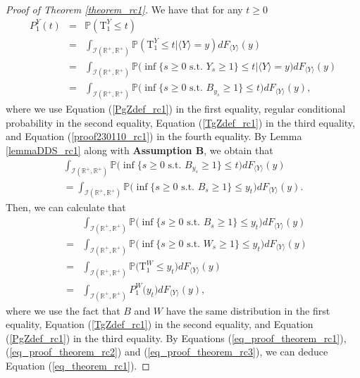 \documentclass[aop]{imsart}
\theoremstyle{plain}
\theoremstyle{remark}
\newcommand{\reels}{\mathbb{R}}
\newcommand{\proba}{\mathbb{P}}
\newcommand{\Tau}{\mathrm{T}}
\begin{document}
\begin{proof}[Proof of Theorem \ref{theorem_rc1}]
We have that for any $t \geq 0$
\begin{eqnarray}
\nonumber P_1^Y(t) & = & \proba (\Tau^Y_1 \leq t)\\ \nonumber & = & \int_{\mathcal{I}(\reels^+,\reels^+)} \proba (\Tau^{Y}_1 \leq t |\langle Y\rangle=y) dF_{\langle Y\rangle}(y)\\ \nonumber 
& = & \int_{\mathcal{I}(\reels^+,\reels^+)} \proba \big(\inf \{s \geq 0 \text{ s.t. } Y_s \geq 1\} \leq t |\langle Y\rangle=y\big)dF_{\langle Y\rangle}(y)\\ \label{eq_proof_theorem_rc1} 
& = & \int_{\mathcal{I}(\reels^+,\reels^+)} \proba \big(\inf \{s \geq 0\text{ s.t. } B_{y_{s}} \geq 1\} \leq t\big)dF_{\langle Y\rangle}(y),
\end{eqnarray}
where we use Equation (\ref{PgZdef_rc1}) in the first equality, regular conditional probability in the second equality,  Equation (\ref{TgZdef_rc1}) in the third equality, and Equation (\ref{proof230110_rc1}) in the fourth equality. By Lemma \ref{lemmaDDS_rc1} along with \textbf{Assumption B}, we obtain that
\begin{eqnarray}
\label{eq_proof_theorem_rc2}\int_{\mathcal{I}(\reels^+,\reels^+)} \proba \big(\inf \{s \geq 0\text{ s.t. } B_{y_{s}} \geq 1\} \leq t\big)dF_{\langle Y\rangle}(y)\\ \nonumber =\int_{\mathcal{I}(\reels^+,\reels^+)} \proba \big(\inf \{s \geq 0\text{ s.t. } B_{s} \geq 1\} \leq y_t \big)dF_{\langle Y\rangle}(y).
\end{eqnarray}
Then, we can calculate that
\begin{eqnarray}
\nonumber && \int_{\mathcal{I}(\reels^+,\reels^+)} \proba \big(\inf \{s \geq 0\text{ s.t. } B_{s} \geq 1\} \leq y_t \big)dF_{\langle Y\rangle}(y)\\ \nonumber & = & \int_{\mathcal{I}(\reels^+,\reels^+)} \proba \big(\inf \{s \geq 0\text{ s.t. } W_{s} \geq 1\} \leq y_t \big)dF_{\langle Y\rangle}(y)\\ \nonumber & = & \int_{\mathcal{I}(\reels^+,\reels^+)} \proba \big(\Tau^W_1  \leq y_t \big)dF_{\langle Y\rangle}(y)\\ \label{eq_proof_theorem_rc3}
& = & \int_{\mathcal{I}(\reels^+,\reels^+)} P_1^W\big(y_t\big) dF_{\langle Y\rangle}(y), 
\end{eqnarray}
where we use the fact that $B$ and $W$ have the same distribution in the first equality, Equation (\ref{TgZdef_rc1}) in the second equality, and Equation (\ref{PgZdef_rc1}) in the third equality. By Equations (\ref{eq_proof_theorem_rc1}), (\ref{eq_proof_theorem_rc2}) and (\ref{eq_proof_theorem_rc3}), we can deduce Equation (\ref{eq_theorem_rc1}).
\end{proof}
\end{document}
